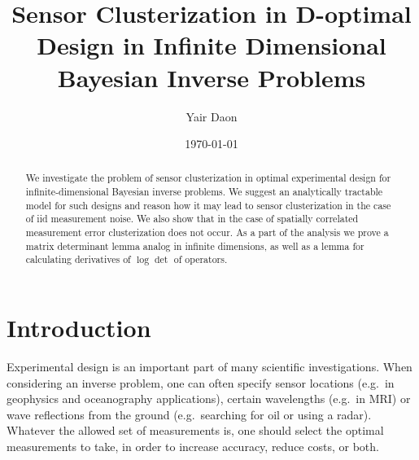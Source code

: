 \documentclass{amsart}
\numberwithin{equation}{section}
\begin{document}
\title[Sensor Clusterization in D-optimal design in infinite
  dimensions]{Sensor Clusterization in D-optimal Design in Infinite
  Dimensional  Bayesian Inverse Problems}

\author{Yair Daon}
\address{Porter School of the Environment and Earth
  Sciences, Tel Aviv University\\ Tel Aviv, Israel}

\date{\today}

\begin{abstract}
  We investigate the problem of sensor clusterization in optimal
  experimental design for infinite-dimensional Bayesian
   inverse problems. We suggest an analytically
  tractable model for such designs and reason how it may lead to
  sensor clusterization in the case of iid measurement noise. We also
  show that in the case of spatially correlated measurement error
  clusterization does not occur. As a part of the analysis we prove a
  matrix determinant lemma analog in infinite dimensions, as well as a
  lemma for calculating derivatives of $\log \det$ of operators.
\end{abstract}

\maketitle

\section{Introduction}\label{section:OED intro}
Experimental design is an important part of many scientific
investigations. When considering an inverse problem, one can often
specify sensor locations (e.g.\ in geophysics and oceanography
applications), certain wavelengths (e.g.\ in MRI) or wave reflections
from the ground (e.g.\ searching for oil or using a radar). Whatever
the allowed set of measurements is, one should select the optimal
measurements to take, in order to increase accuracy, reduce costs, or
both.
\end{document}
